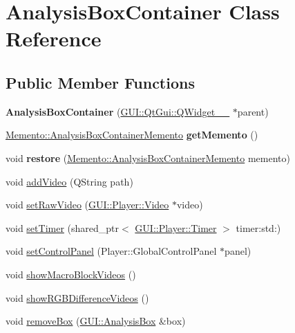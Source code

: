 \hypertarget{classGUI_1_1AnalysisBoxContainer}{}\section{Analysis\+Box\+Container Class Reference}
\label{classGUI_1_1AnalysisBoxContainer}
\subsection*{Public Member Functions}
\begin{DoxyCompactItemize}
\item 
\hypertarget{classGUI_1_1AnalysisBoxContainer_a018ac35d2393629ed28fb6331019aaf0}{}{\bfseries Analysis\+Box\+Container} (\hyperlink{classGUI_1_1QtGui_1_1QWidget____10}{G\+U\+I\+::\+Qt\+Gui\+::\+Q\+Widget\+\_\+\+\_} $\ast$parent)\label{classGUI_1_1AnalysisBoxContainer_a018ac35d2393629ed28fb6331019aaf0}

\item 
\hypertarget{classGUI_1_1AnalysisBoxContainer_a0743a7c422123fbd5d22a946af5092ca}{}\hyperlink{classMemento_1_1AnalysisBoxContainerMemento}{Memento\+::\+Analysis\+Box\+Container\+Memento} {\bfseries get\+Memento} ()\label{classGUI_1_1AnalysisBoxContainer_a0743a7c422123fbd5d22a946af5092ca}

\item 
\hypertarget{classGUI_1_1AnalysisBoxContainer_af6d8c35bc3f7000da0579310af42e756}{}void {\bfseries restore} (\hyperlink{classMemento_1_1AnalysisBoxContainerMemento}{Memento\+::\+Analysis\+Box\+Container\+Memento} memento)\label{classGUI_1_1AnalysisBoxContainer_af6d8c35bc3f7000da0579310af42e756}

\item 
void \hyperlink{classGUI_1_1AnalysisBoxContainer_af3b761e148d9cb7352c5ffb4bf4c66bd}{add\+Video} (Q\+String path)
\item 
void \hyperlink{classGUI_1_1AnalysisBoxContainer_ae45e621cb87a85ffb069ac765a306711}{set\+Raw\+Video} (\hyperlink{classGUI_1_1Player_1_1Video}{G\+U\+I\+::\+Player\+::\+Video} $\ast$video)
\item 
void \hyperlink{classGUI_1_1AnalysisBoxContainer_a0a63304dda40cabeda44acd79bb08b59}{set\+Timer} (shared\+\_\+ptr$<$ \hyperlink{classGUI_1_1Player_1_1Timer}{G\+U\+I\+::\+Player\+::\+Timer} $>$ timer\+:std\+:)
\item 
void \hyperlink{classGUI_1_1AnalysisBoxContainer_a9c1b482d1dcd6a733b84a9cdcc960263}{set\+Control\+Panel} (Player\+::\+Global\+Control\+Panel $\ast$panel)
\item 
void \hyperlink{classGUI_1_1AnalysisBoxContainer_ab3d9dc42d8e78c5bf6f87c5e93bdf1ce}{show\+Macro\+Block\+Videos} ()
\item 
void \hyperlink{classGUI_1_1AnalysisBoxContainer_a91638333a4b3fe577fd2062f2aa667f3}{show\+R\+G\+B\+Difference\+Videos} ()
\item 
void \hyperlink{classGUI_1_1AnalysisBoxContainer_a181a2114e38722fcae5a9c1d5b1d0ff7}{remove\+Box} (\hyperlink{classGUI_1_1AnalysisBox}{G\+U\+I\+::\+Analysis\+Box} \&box)
\end{DoxyCompactItemize}


